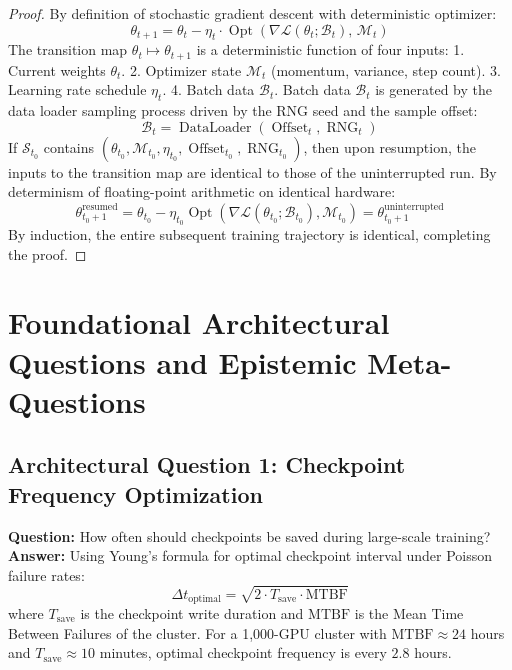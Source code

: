 \documentclass[11pt,a4paper]{article}
\theoremstyle{definition}
\begin{document}
\begin{proof}
By definition of stochastic gradient descent with deterministic optimizer:
{\boldmath
\begin{equation}
\theta_{t+1} = \theta_t - \eta_t \cdot \operatorname{Opt}\left( \nabla \mathcal{L}(\theta_t; \mathcal{B}_t), \, \mathcal{M}_t \right)
\end{equation}
}
The transition map $\theta_t \mapsto \theta_{t+1}$ is a deterministic function of four inputs:
1. Current weights $\theta_t$.
2. Optimizer state $\mathcal{M}_t$ (momentum, variance, step count).
3. Learning rate schedule $\eta_t$.
4. Batch data $\mathcal{B}_t$.
Batch data $\mathcal{B}_t$ is generated by the data loader sampling process driven by the RNG seed and the sample offset:
{\boldmath
\begin{equation}
\mathcal{B}_t = \operatorname{DataLoader}(\operatorname{Offset}_t, \operatorname{RNG}_t)
\end{equation}
}
If $\mathcal{S}_{t_0}$ contains $(\theta_{t_0}, \mathcal{M}_{t_0}, \eta_{t_0}, \operatorname{Offset}_{t_0}, \operatorname{RNG}_{t_0})$, then upon resumption, the inputs to the transition map are identical to those of the uninterrupted run.
By determinism of floating-point arithmetic on identical hardware:
{\boldmath
\begin{equation}
\theta_{t_0+1}^{\text{resumed}} = \theta_{t_0} - \eta_{t_0} \operatorname{Opt}\left( \nabla \mathcal{L}(\theta_{t_0}; \mathcal{B}_{t_0}), \mathcal{M}_{t_0} \right) = \theta_{t_0+1}^{\text{uninterrupted}}
\end{equation}
}
By induction, the entire subsequent training trajectory is identical, completing the proof.
\end{proof}

\section{Foundational Architectural Questions and Epistemic Meta-Questions}

\subsection{Architectural Question 1: Checkpoint Frequency Optimization}
\textbf{Question:} How often should checkpoints be saved during large-scale training?\\
\textbf{Answer:} Using Young's formula for optimal checkpoint interval under Poisson failure rates:
{\boldmath
\begin{equation}
\Delta t_{\text{optimal}} = \sqrt{2 \cdot T_{\text{save}} \cdot \text{MTBF}}
\end{equation}
}
where $T_{\text{save}}$ is the checkpoint write duration and $\text{MTBF}$ is the Mean Time Between Failures of the cluster. For a 1,000-GPU cluster with $\text{MTBF} \approx 24$ hours and $T_{\text{save}} \approx 10$ minutes, optimal checkpoint frequency is every $2.8$ hours.
\end{document}
